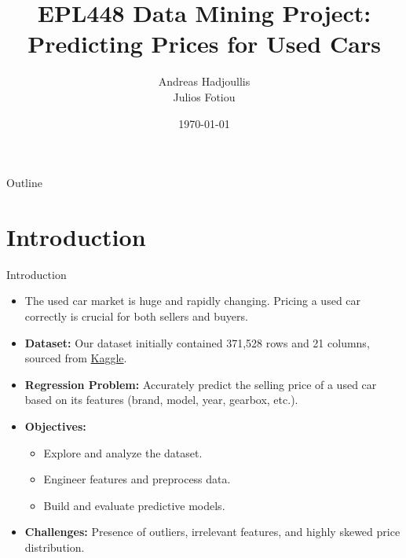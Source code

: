 \documentclass{beamer}
\title[]{EPL448 Data Mining Project: Predicting Prices for Used Cars}
\author[]{Andreas Hadjoullis\\Julios Fotiou}
\institute[]{Department of Computer Science \\ University of Cyprus}
\date[]{\today}
\begin{document}
\begin{frame}
        \titlepage
\end{frame}

\begin{frame}{Outline}
        \tableofcontents
\end{frame}

\section{Introduction}
\begin{frame}{Introduction}
        \begin{itemize}
                \item The used car market is huge and rapidly changing. Pricing
                        a used car correctly is crucial for both sellers and
                        buyers.
                \item \textbf{Dataset:} Our dataset initially contained 371,528
                        rows and 21 columns, sourced from \href{https://www.kaggle.com/datasets/thedevastator/uncovering-factors-that-affect-used-car-prices/data}{Kaggle}.
                \item \textbf{Regression Problem:} Accurately predict the selling price of
                        a used car based on its features (brand, model, year,
                        gearbox, etc.).
                \item \textbf{Objectives:}
                        \begin{itemize}
                                \item Explore and analyze the dataset.
                                \item Engineer features and preprocess data.
                                \item Build and evaluate predictive models.
                        \end{itemize}
                \item \textbf{Challenges:} Presence of outliers, irrelevant
                        features, and highly skewed price distribution.
        \end{itemize}
\end{frame}

\end{document}
